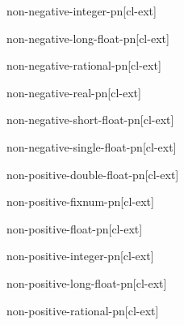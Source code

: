 \documentclass[10pt,english]{book}
\begin{document}
\begin{function}{non-negative-integer-p}{n}[cl-ext]
  
\end{function}

\begin{function}{non-negative-long-float-p}{n}[cl-ext]
  
\end{function}

\begin{function}{non-negative-rational-p}{n}[cl-ext]
  
\end{function}

\begin{function}{non-negative-real-p}{n}[cl-ext]
  
\end{function}

\begin{function}{non-negative-short-float-p}{n}[cl-ext]
  
\end{function}

\begin{function}{non-negative-single-float-p}{n}[cl-ext]
  
\end{function}

\begin{function}{non-positive-double-float-p}{n}[cl-ext]
  
\end{function}

\begin{function}{non-positive-fixnum-p}{n}[cl-ext]
  
\end{function}

\begin{function}{non-positive-float-p}{n}[cl-ext]
  
\end{function}

\begin{function}{non-positive-integer-p}{n}[cl-ext]
  
\end{function}

\begin{function}{non-positive-long-float-p}{n}[cl-ext]
  
\end{function}

\begin{function}{non-positive-rational-p}{n}[cl-ext]
  
\end{function}
\end{document}
